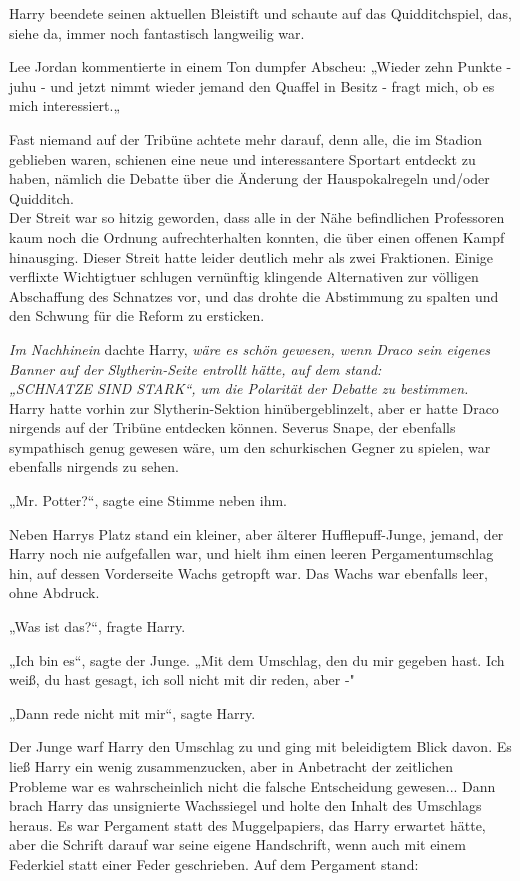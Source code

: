 {Harry beendete seinen aktuellen Bleistift und schaute auf das Quidditchspiel, das, siehe da, immer noch fantastisch langweilig war.

Lee Jordan kommentierte in einem Ton dumpfer Abscheu: „Wieder zehn Punkte - juhu - und jetzt nimmt wieder jemand den Quaffel in Besitz - fragt mich, ob es mich interessiert.„

Fast niemand auf der Tribüne achtete mehr darauf, denn alle, die im Stadion geblieben waren, schienen eine neue und interessantere Sportart entdeckt zu haben, nämlich die Debatte über die Änderung der Hauspokalregeln und/oder Quidditch.\\ Der Streit war so hitzig geworden, dass alle in der Nähe befindlichen Professoren kaum noch die Ordnung aufrechterhalten konnten, die über einen offenen Kampf hinausging. Dieser Streit hatte leider deutlich mehr als zwei Fraktionen. Einige verflixte Wichtigtuer schlugen vernünftig klingende Alternativen zur völligen Abschaffung des Schnatzes vor, und das drohte die Abstimmung zu spalten und den Schwung für die Reform zu ersticken.

\emph{Im Nachhinein} dachte Harry, \emph{wäre es schön gewesen, wenn Draco sein eigenes Banner auf der Slytherin-Seite entrollt hätte, auf dem stand:\\ „SCHNATZE SIND STARK“, um die Polarität der Debatte zu bestimmen.}\\ Harry hatte vorhin zur Slytherin-Sektion hinübergeblinzelt, aber er hatte Draco nirgends auf der Tribüne entdecken können. Severus Snape, der ebenfalls sympathisch genug gewesen wäre, um den schurkischen Gegner zu spielen, war ebenfalls nirgends zu sehen.

„Mr. Potter?“, sagte eine Stimme neben ihm.

Neben Harrys Platz stand ein kleiner, aber älterer Hufflepuff-Junge, jemand, der Harry noch nie aufgefallen war, und hielt ihm einen leeren Pergamentumschlag hin, auf dessen Vorderseite Wachs getropft war. Das Wachs war ebenfalls leer, ohne Abdruck.

„Was ist das?“, fragte Harry.

„Ich bin es“, sagte der Junge. „Mit dem Umschlag, den du mir gegeben hast. Ich weiß, du hast gesagt, ich soll nicht mit dir reden, aber -"

„Dann rede nicht mit mir“, sagte Harry.

Der Junge warf Harry den Umschlag zu und ging mit beleidigtem Blick davon. Es ließ Harry ein wenig zusammenzucken, aber in Anbetracht der zeitlichen Probleme war es wahrscheinlich nicht die falsche Entscheidung gewesen... Dann brach Harry das unsignierte Wachssiegel und holte den Inhalt des Umschlags heraus. Es war Pergament statt des Muggelpapiers, das Harry erwartet hätte, aber die Schrift darauf war seine eigene Handschrift, wenn auch mit einem Federkiel statt einer Feder geschrieben. Auf dem Pergament stand:

}

